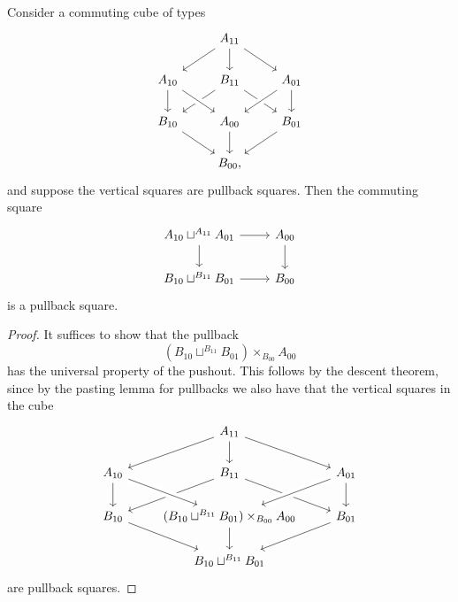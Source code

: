 \begin{thm}
Consider a commuting cube of types 
\begin{equation}\label{eq:cube}
\begin{tikzcd}
& A_{11} \arrow[dl] \arrow[dr] \arrow[d] \\
A_{10} \arrow[d] & B_{11} \arrow[dl] \arrow[dr] & A_{01} \arrow[dl,crossing over] \arrow[d] \\
B_{10} \arrow[dr] & A_{00} \arrow[d] \arrow[from=ul,crossing over] & B_{01} \arrow[dl] \\
& B_{00},
\end{tikzcd}
\end{equation}
and suppose the vertical squares are pullback squares. Then the commuting square
\begin{equation*}
\begin{tikzcd}
A_{10}\sqcup^{A_{11}} A_{01} \arrow[r] \arrow[d] & A_{00} \arrow[d] \\
B_{10}\sqcup^{B_{11}} B_{01} \arrow[r] & B_{00}
\end{tikzcd}
\end{equation*}
is a pullback square.
\end{thm}

\begin{proof}
It suffices to show that the pullback 
\begin{equation*}
(B_{10}\sqcup^{B_{11}} B_{01})\times_{B_{00}}A_{00}
\end{equation*}
has the universal property of the pushout. This follows by the descent theorem, since by the pasting lemma for pullbacks we also have that the vertical squares in the cube
\begin{equation*}
\begin{tikzcd}
& A_{11} \arrow[dl] \arrow[dr] \arrow[d] \\
A_{10} \arrow[d] & B_{11} \arrow[dl] \arrow[dr] & A_{01} \arrow[dl,crossing over] \arrow[d] \\
B_{10} \arrow[dr] & (B_{10}\sqcup^{B_{11}} B_{01})\times_{B_{00}}A_{00} \arrow[d] \arrow[from=ul,crossing over] & B_{01} \arrow[dl] \\
& B_{10}\sqcup^{B_{11}} B_{01}
\end{tikzcd}
\end{equation*}
are pullback squares.
\end{proof}

